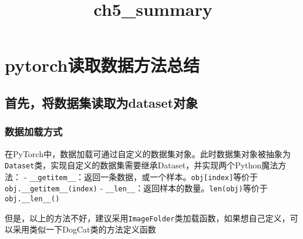 \documentclass[11pt]{article}
\title{ch5\_summary}
\begin{document}
    
    
    \maketitle
    
    

    
    \section{pytorch读取数据方法总结}\label{pytorchux8bfbux53d6ux6570ux636eux65b9ux6cd5ux603bux7ed3}

\subsection{首先，将数据集读取为dataset对象}\label{ux9996ux5148ux5c06ux6570ux636eux96c6ux8bfbux53d6ux4e3adatasetux5bf9ux8c61}

\subsubsection{数据加载方式}\label{ux6570ux636eux52a0ux8f7dux65b9ux5f0f}

在PyTorch中，数据加载可通过自定义的数据集对象。此时数据集对象被抽象为\texttt{Dataset}类，实现自定义的数据集需要继承Dataset，并实现两个Python魔法方法：
-
\texttt{\_\_getitem\_\_}：返回一条数据，或一个样本。\texttt{obj{[}index{]}}等价于\texttt{obj.\_\_getitem\_\_(index)}
-
\texttt{\_\_len\_\_}：返回样本的数量。\texttt{len(obj)}等价于\texttt{obj.\_\_len\_\_()}

但是，以上的方法不好，建议采用\texttt{ImageFolder}类加载函数，如果想自己定义，可以采用类似一下DogCat类的方法定义函数
\end{document}
